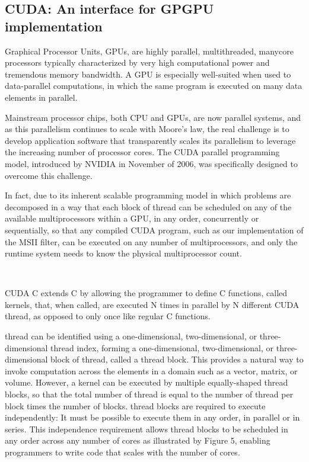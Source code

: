 \subsection{CUDA: An interface for GPGPU implementation}
Graphical Processor Units, GPUs, are highly parallel, multithreaded, manycore
processors typically characterized by very high computational power and
tremendous memory bandwidth. A GPU is especially well-suited when used to
data-parallel computations, in which the same program is executed on many data
elements in parallel.~\cite[p.~1.1]{CUDA18}

Mainstream processor chips, both CPU and GPUs, are now parallel systems, and as
this parallelism continues to scale with Moore's law, the real challenge is to
develop application software that transparently scales its parallelism to
leverage the increasing number of processor cores. The CUDA parallel
programming model, introduced by NVIDIA in November of 2006, was specifically
designed to overcome this challenge.~\cite[p.~1.3]{CUDA18}

In fact, due to its inherent scalable programming model in which problems are
decomposed in a way that each block of thread can be scheduled on
any of the available multiprocessors within a GPU, in any order, concurrently
or sequentially, so that any compiled CUDA program, such as our implementation
of the MSII filter, can be executed on any number of multiprocessors, and only
the runtime system needs to know the physical multiprocessor
count.~\cite[p.~1.3]{CUDA18}

~~~~~~~~~

CUDA C extends C by allowing the programmer to define C functions, called
kernels, that, when called, are executed N times in parallel by N different
CUDA thread, as opposed to only once like regular C
functions.~\cite[p.~2.1]{CUDA18}

thread can be identified using a one-dimensional,
two-dimensional, or three-dimensional thread index, forming a
one-dimensional, two-dimensional, or three-dimensional block of
thread, called a thread block. This provides a
natural way to invoke computation across the elements in a domain such as a
vector, matrix, or volume. However, a kernel can be executed by multiple
equally-shaped thread blocks, so that the total number of
thread is equal to the number of thread per block
times the number of blocks. thread blocks are required to execute
independently: It must be possible to execute them in any order, in parallel or
in series. This independence requirement allows thread blocks to
be scheduled in any order across any number of cores as illustrated by Figure 5,
enabling programmers to write code that scales with the number of
cores.~\cite[p.~2.2]{CUDA18}

